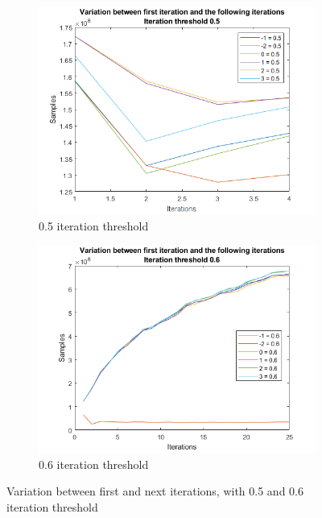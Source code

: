 \begin{figure}
    \centering
    \begin{subfigure}[b]{.49\textwidth}
        \centering
        \includegraphics[width=\textwidth]{figures/varfirst-0.5.png}
        \caption{0.5 iteration threshold}
        \label{sfig:iter:varfirst0.5}
    \end{subfigure}
    \hfill
    \begin{subfigure}[b]{.49\textwidth}
        \centering
        \includegraphics[width=\textwidth]{figures/varfirst-0.6.png}
        \caption{0.6 iteration threshold}
        \label{sfig:iter:varfirst0.6}
    \end{subfigure}
    \caption{Variation between first and next iterations, with 0.5 and 0.6 iteration threshold}
    \label{fig:iter:varfirst0.50.6}
\end{figure}

